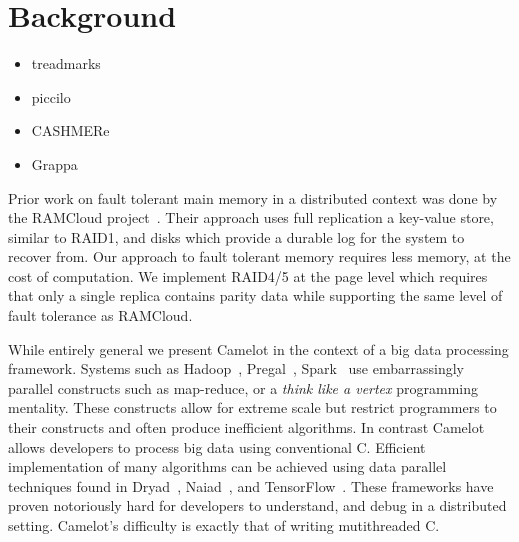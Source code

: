 \section{Background}
\label{sec:background}

\begin{itemize}
    \item treadmarks~\cite{Keleher1994}  \\
    \item piccilo~\cite{piccolo}   \\
    \item CASHMERe ~\cite{cashmere}   \\
    \item Grappa~\cite{Nelson2015} \\
\end{itemize}

    Prior work on fault tolerant main memory in a distributed
        context was done by the RAMCloud
        project~\cite{Ousterhout:2015:RSS:2818727.2806887}. Their
        approach uses full replication a key-value store, similar to
        RAID1, and disks which provide a durable log for the system to
        recover from.  Our approach to fault tolerant memory requires
        less memory, at the cost of computation. We implement RAID4/5
        at the page level which requires that only a single replica
        contains parity data while supporting the same level of fault
        tolerance as RAMCloud.

    While entirely general we present Camelot in the context of
        a big data processing framework. Systems such as
        Hadoop~\cite{Dean2004},
        Pregal~\cite{Malewicz:2010:PSL:1807167.1807184},
        Spark~\cite{180560} use embarrassingly parallel constructs such
        as map-reduce, or a \textit{think like a vertex} programming
        mentality. These constructs allow for extreme scale but
        restrict programmers to their constructs and often produce
        inefficient algorithms. In contrast Camelot allows developers
        to process big data using conventional C. Efficient
        implementation of many algorithms can be achieved using data
        parallel techniques found in
        Dryad~\cite{Isard:2007:DDD:1272996.1273005},
        Naiad~\cite{Murray2013}, and
        TensorFlow~\cite{tensorflow2015-whitepaper}. These frameworks
        have proven notoriously hard for developers to understand, and
        debug in a distributed setting. Camelot's difficulty is
        exactly that of writing mutithreaded C.
